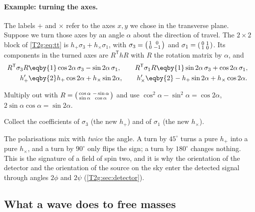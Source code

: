 \paragraph{Example: turning the axes.}
The labels $+$ and $\times$ refer to the axes $x,y$ we chose in the transverse plane. Suppose we turn those axes by an angle $\alpha$ about the direction of travel. The $2\times2$ block of \eqref{T2g:eq:tt} is $h_+\sigma_3+h_\times\sigma_1$, with $\sigma_3=\begin{psmallmatrix}1&0\\0&-1\end{psmallmatrix}$ and $\sigma_1=\begin{psmallmatrix}0&1\\1&0\end{psmallmatrix}$. Its components in the turned axes are $R^{\mathsf T}hR$ with $R$ the rotation matrix by $\alpha$, and
\begin{align}
  R^{\mathsf T}\sigma_3R&\eqby{1}\cos2\alpha\,\sigma_3-\sin2\alpha\,\sigma_1,\qquad
  R^{\mathsf T}\sigma_1R\eqby{1}\sin2\alpha\,\sigma_3+\cos2\alpha\,\sigma_1,\nonumber\\
  h_+'&\eqby{2}h_+\cos2\alpha+h_\times\sin2\alpha,\qquad
  h_\times'\eqby{2}-h_+\sin2\alpha+h_\times\cos2\alpha .
  \label{T2g:eq:rotate}
\end{align}
\begin{explain}
  \item Multiply out with $R=\begin{psmallmatrix}\cos\alpha&-\sin\alpha\\ \sin\alpha&\cos\alpha\end{psmallmatrix}$ and use $\cos^2\alpha-\sin^2\alpha=\cos2\alpha$, $2\sin\alpha\cos\alpha=\sin2\alpha$.
  \item Collect the coefficients of $\sigma_3$ (the new $h_+$) and of $\sigma_1$ (the new $h_\times$).
\end{explain}
The polarisations mix with \emph{twice} the angle. A turn by $45^\circ$ turns a pure $h_+$ into a pure $h_\times$, and a turn by $90^\circ$ only flips the sign; a turn by $180^\circ$ changes nothing. This is the signature of a field of spin two, and it is why the orientation of the detector and the orientation of the source on the sky enter the detected signal through angles $2\phi$ and $2\psi$ (\cref{T2g:sec:detector}).

\subsection{What a wave does to free masses}
\label{T2g:sec:free-masses}

